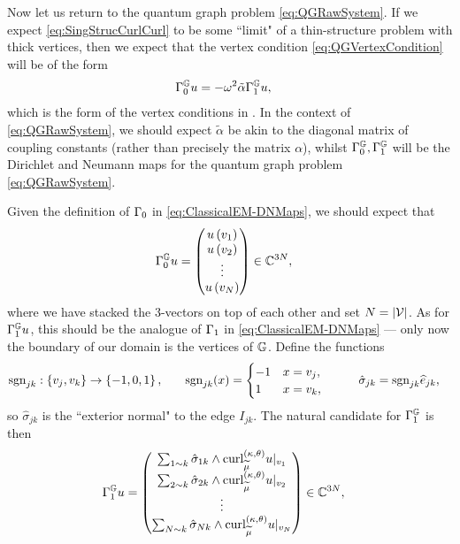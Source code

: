 Now let us return to the quantum graph problem \eqref{eq:QGRawSystem}.
If we expect \eqref{eq:SingStrucCurlCurl} to be some ``limit" of a thin-structure problem with thick vertices, then we expect that the vertex condition \eqref{eq:QGVertexCondition} will be of the form
\begin{align} \label{eq:DispersiveBC}
	\Gamma_0^{\mathbb{G}} u &= -\omega^2 \tilde{\alpha} \Gamma_1^{\mathbb{G}} u,
\end{align}
which is the form of the vertex conditions in .
In the context of \eqref{eq:QGRawSystem}, we should expect $\tilde{\alpha}$ be akin to the diagonal matrix of coupling constants (rather than precisely the matrix $\alpha$), whilst $\Gamma_0^{\mathbb{G}}, \Gamma_1^{\mathbb{G}}$ will be the Dirichlet and Neumann maps for the quantum graph problem \eqref{eq:QGRawSystem}.

Given the definition of $\Gamma_0$ in \eqref{eq:ClassicalEM-DNMaps}, we should expect that
\begin{align} \label{eq:DGMapDef}
	\Gamma_0^{\mathbb{G}} u &= 
	\begin{pmatrix}
		u\left( v_1 \right) \\ u\left( v_2 \right) \\ \vdots \\ u\left( v_N \right)
	\end{pmatrix}
	\in\mathbb{C}^{3N},
\end{align}
where we have stacked the 3-vectors on top of each other and set $N=\left\lvert \mathcal{V} \right\rvert$.
As for $\Gamma_1^{\mathbb{G}} u$, this should be the analogue of $\Gamma_1$ in \eqref{eq:ClassicalEM-DNMaps} --- only now the boundary of our domain is the vertices of $\mathbb{G}$.
Define the functions 
\begin{align*}
	\mathrm{sgn}_{jk}: \left\{ v_j, v_k \right\} \rightarrow \left\{ -1,0,1 \right\}, 
	&\qquad
	\mathrm{sgn}_{jk}(x) = \begin{cases} -1 & x=v_j, \\ 1 & x=v_k, \end{cases}
	&\qquad
	\hat{\sigma}_{jk} &= \mathrm{sgn}_{jk}\widehat{e}_{jk},
\end{align*}
so $\hat{\sigma}_{jk}$ is the ``exterior normal" to the edge $I_{jk}$.
The natural candidate for $\Gamma_1^{\mathbb{G}}$ is then 
\begin{align} \label{eq:NGMapDef}
	\Gamma_1^{\mathbb{G}} u &= 
	\begin{pmatrix}
		\sum_{1\sim k} \hat{\sigma}_{1k}\wedge\mathrm{curl}_{\widetilde{\mu}}^{\left( \kappa, \theta \right)}u\vert_{v_1} \\
		\sum_{2\sim k} \hat{\sigma}_{2k}\wedge\mathrm{curl}_{\widetilde{\mu}}^{\left( \kappa, \theta \right)}u\vert_{v_2} \\
		\vdots \\
		\sum_{N\sim k} \hat{\sigma}_{Nk}\wedge\mathrm{curl}_{\widetilde{\mu}}^{\left( \kappa, \theta \right)}u\vert_{v_N}
	\end{pmatrix}
	\in\mathbb{C}^{3N},
\end{align}
